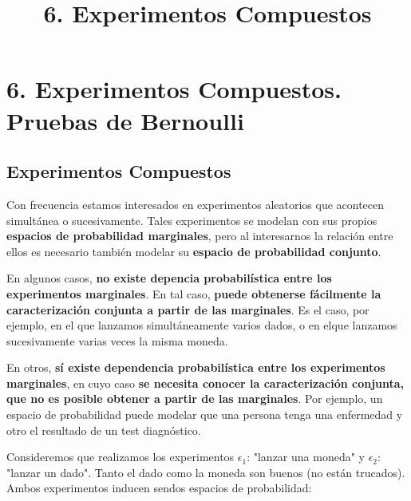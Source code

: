 \documentclass[11pt]{article}
\title{6. Experimentos Compuestos}
\begin{document}
    
    
    \maketitle
    
    

    
    \section*{6. Experimentos Compuestos. Pruebas de
Bernoulli}\label{experimentos-compuestos.-pruebas-de-bernoulli}

\subsection*{Experimentos Compuestos}\label{experimentos-compuestos}

Con frecuencia estamos interesados en experimentos aleatorios que
acontecen simultánea o sucesivamente. Tales experimentos se modelan con
sus propios \textbf{espacios de probabilidad marginales}, pero al
interesarnos la relación entre ellos es necesario también modelar su
\textbf{espacio de probabilidad conjunto}.

En algunos casos, \textbf{no existe depencia probabilística entre los
experimentos marginales}. En tal caso, \textbf{puede obtenerse
fácilmente la caracterización conjunta a partir de las marginales}. Es
el caso, por ejemplo, en el que lanzamos simultáneamente varios dados, o
en elque lanzamos sucesivamente varias veces la misma moneda.

En otros, \textbf{sí existe dependencia probabilística entre los
experimentos marginales}, en cuyo caso \textbf{se necesita conocer la
caracterización conjunta, que no es posible obtener a partir de las
marginales}. Por ejemplo, un espacio de probabilidad puede modelar que
una persona tenga una enfermedad y otro el resultado de un test
diagnóstico.

    Consideremos que realizamos los experimentos \(\epsilon_1\): "lanzar una
moneda" y \(\epsilon_2\): "lanzar un dado". Tanto el dado como la moneda
son buenos (no están trucados). Ambos experimentos inducen sendos
espacios de probabilidad:
\end{document}
